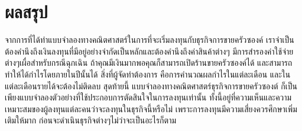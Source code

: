\documentclass{report}
\begin{document}
\chapter{ผลสรุป}
จากการที่ได้ทำแบบจำลองทางคณิตศาสตร์ในการที่จะเริ่มลงทุนกับธุรกิจการขายครัวซองค์ เราจำเป็นต้องคำนึงถึงเงินลงทุนที่มีอยู่อย่างจำกัดเป็นหลักและต้องคำนึงถึงค่าสินค้าต่างๆ มีการสำรองค่าใช้จ่ายต่างๆเผื่อสำหรับกรณีฉุกเฉิน
ถ้าคุณมีเงินมากพอคุณก็สามารถเปิดร้านขายครัวซองค์ได้ และสามารถทำให้ได้กำไรโดยภายในปีนั้นได้
สิ่งที่ผู้จัดทำต้องการ คือการคำนวณผลกำไรในแต่ละเดือน และในแต่ละเดือนรายได้จะต้องไม่ติดลบ
สุดท้ายนี้ แบบจำลองทางคณิตศาสตร์ธุรกิจการขายครัวซองต์ ก็เป็นเพียงแบบจำลองตัวอย่างที่ใช้ประกอบการตัดสินใจในการลงทุนเท่านั้น ทั้งนี้อยู่ที่ความเห็นและความเหมาะสมของผู้ลงทุนแต่ละคนว่าจะลงทุนในธุรกิจนี้หรือไม่ เพราะการลงทุนมีความเสี่ยงควรศึกษาเพิ่มเติมให้มาก ก่อนจะดำเนินธุรกิจต่างๆไม่ว่าจะเป็นอะไรก็ตาม
 

 
\printbibliography
\end{document}
